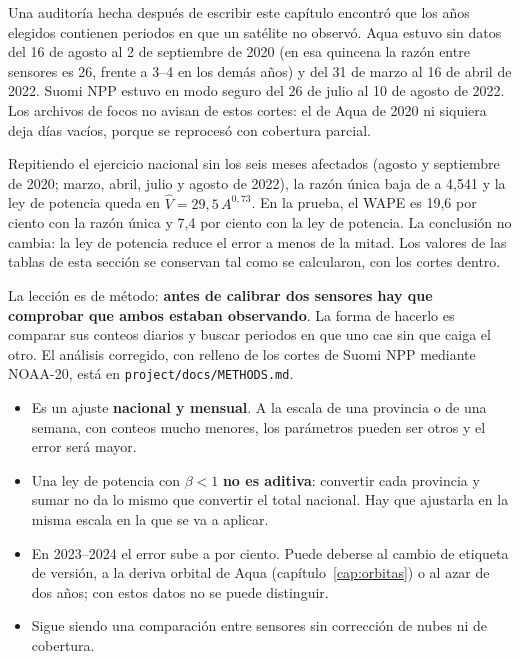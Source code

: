 \begin{atencion}
Una auditoría hecha después de escribir este capítulo encontró que los años elegidos contienen
periodos en que un satélite no observó. Aqua estuvo sin datos del 16 de agosto al 2 de
septiembre de 2020 (en esa quincena la razón entre sensores es 26, frente a 3--4 en los demás
años) y del 31 de marzo al 16 de abril de 2022. Suomi NPP estuvo en modo seguro del 26 de julio
al 10 de agosto de 2022. Los archivos de focos no avisan de estos cortes: el de Aqua de 2020 ni
siquiera deja días vacíos, porque se reprocesó con cobertura parcial.

Repitiendo el ejercicio nacional sin los seis meses afectados (agosto y septiembre de 2020;
marzo, abril, julio y agosto de 2022), la razón única baja de \PeruRatio{} a 4,541 y la ley de
potencia queda en $\widehat V = 29{,}5\,A^{0{,}73}$. En la prueba, el WAPE es 19,6 por ciento
con la razón única y 7,4 por ciento con la ley de potencia. La conclusión no cambia: la ley de
potencia reduce el error a menos de la mitad. Los valores de las tablas de esta sección se
conservan tal como se calcularon, con los cortes dentro.

La lección es de método: \textbf{antes de calibrar dos sensores hay que comprobar que ambos
estaban observando}. La forma de hacerlo es comparar sus conteos diarios y buscar periodos en
que uno cae sin que caiga el otro. El análisis corregido, con relleno de los cortes de Suomi
NPP mediante NOAA-20, está en \texttt{project/docs/METHODS.md}.
\end{atencion}

\begin{atencion}
\begin{itemize}
  \item Es un ajuste \textbf{nacional y mensual}. A la escala de una provincia o de una
  semana, con conteos mucho menores, los parámetros pueden ser otros y el error será mayor.
  \item Una ley de potencia con $\beta<1$ \textbf{no es aditiva}: convertir cada provincia
  y sumar no da lo mismo que convertir el total nacional. Hay que ajustarla en la misma
  escala en la que se va a aplicar.
  \item En 2023--2024 el error sube a \PeruDespuesPot{} por ciento. Puede deberse al cambio
  de etiqueta de versión, a la deriva orbital de Aqua (capítulo~\ref{cap:orbitas}) o al azar
  de dos años; con estos datos no se puede distinguir.
  \item Sigue siendo una comparación entre sensores sin corrección de nubes ni de cobertura.
\end{itemize}
\end{atencion}

